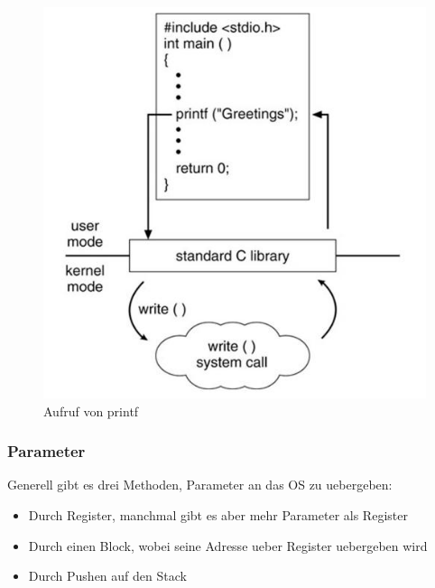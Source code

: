 \documentclass[a4paper]{scrreprt}
\begin{document}
\begin{figure}[ht]
\centering
\includegraphics[scale=0.4]{graphics/printf.png}
\caption{Aufruf von printf}
\end{figure}

\subsubsection{Parameter}
Generell gibt es drei Methoden, Parameter an das OS zu uebergeben:
\begin{itemize}
	\item Durch Register, manchmal gibt es aber mehr Parameter als Register
	\item Durch einen Block, wobei seine Adresse ueber Register uebergeben wird
	\item Durch Pushen auf den Stack
\end{itemize}
\end{document}
